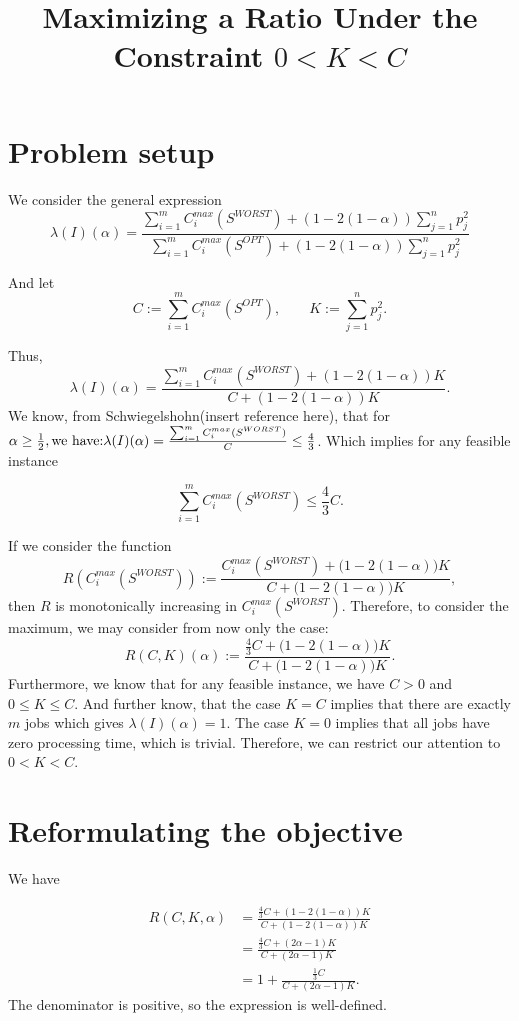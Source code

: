 \documentclass[11pt]{article}
\title{Maximizing a Ratio Under the Constraint $0<K<C$}
\author{}
\date{}
\begin{document}
\maketitle

\section{Problem setup}


We consider the general expression
\[
    \lambda(I)(\alpha)=\frac{\sum_{i=1}^{m} C^{max}_{i}(S^{WORST})+(1-2(1-\alpha))\sum_{j=1}^{n}p_{j}^{2}}{\sum_{i=1}^{m} C^{max}_{i}(S^{OPT})+(1-2(1-\alpha))\sum_{j=1}^{n}p_{j}^{2}}
\]

And let \[
    C:=\sum_{i=1}^{m} C^{max}_{i}(S^{OPT}), \qquad K:=\sum_{j=1}^{n}p_{j}^{2}.
\]

Thus, 
\[
    \lambda(I)(\alpha)=\frac{\sum_{i=1}^{m} C^{max}_{i}(S^{WORST})+(1-2(1-\alpha))K}{C+(1-2(1-\alpha))K}.
\]
We know, from Schwiegelshohn(insert reference here), that for \(\alpha \ge
\frac12, \space \text{we have:} \space \lambda(I)(\alpha) = \frac{\sum_{i=1}^{m} C^{max}_{i}(S^{WORST})}{C}\le \frac43 \).
Which implies for any feasible instance 

\[
    \sum_{i=1}^{m} C^{max}_{i}(S^{WORST})
    \leq
    \frac43 C.
\]

If we consider the function
 \[
    R(C^{max}_{i}(S^{WORST}))
    :=
    \frac{C^{max}_{i}(S^{WORST}) + \bigl(1-2(1-\alpha)\bigr)K}
         {C + \bigl(1-2(1-\alpha)\bigr)K},
\]
then $R$ is monotonically increasing in $C^{max}_{i}(S^{WORST})$. Therefore, to consider the maximum, we may consider from now only the case: 
\[
    R(C,K)(\alpha)
    :=
    \frac{\frac43 C + \bigl(1-2(1-\alpha)\bigr)K}
         {C + \bigl(1-2(1-\alpha)\bigr)K}.
\]
Furthermore, we know that for any feasible instance, we have $C>0$ and $0 \le K \le C$. And further know, 
that the case $K=C$ implies that there are exactly $m$ jobs which gives $\lambda(I)(\alpha) = 1$. The case 
$K=0$ implies that all jobs have zero processing time, which is trivial.
Therefore, we can restrict our attention to $0<K <C$.


\section{Reformulating the objective}


We have

\begin{align*}
    R(C,K,\alpha)
    &=
    \frac{\frac43 C+(1-2(1-\alpha))K}{C+(1-2(1-\alpha))K} \\
    &=
    \frac{\frac43 C+(2\alpha-1)K}{C+(2\alpha-1)K}\\
    &=
    1+
    \frac{\frac13 C}{C+(2\alpha-1)K}.
\end{align*}
The denominator is positive, so the expression is well-defined.
\end{document}

